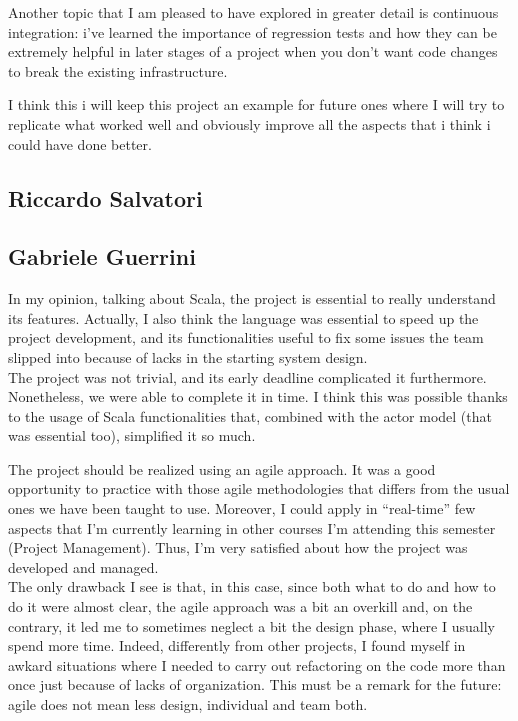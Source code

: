 Another topic that I am pleased to have explored in greater detail is continuous integration: i've learned the importance of regression tests and how they can be extremely helpful in later stages of a project when you don't want code changes to break the existing infrastructure.

I think this i will keep this project an example for future ones where I will try to replicate what worked well and
obviously improve all the aspects that i think i could have done better.




\subsection{Riccardo Salvatori}

\subsection{Gabriele Guerrini}
In my opinion, talking about Scala, the project is essential to really understand its features. Actually, I also think the language was essential to speed up the project development, and its functionalities useful to fix some issues the team slipped into because of lacks in the starting system design.
\\
The project was not trivial, and its early deadline complicated it furthermore. Nonetheless, we were able to complete it in time. I think this was possible thanks to the usage of Scala functionalities that, combined with the actor model (that was essential too), simplified it so much.

\bigskip
The project should be realized using an agile approach. It was a good opportunity to practice with those agile methodologies that differs from the usual ones we have been taught to use.
Moreover, I could apply in ``real-time'' few aspects that I'm currently learning in other courses I'm attending this semester (Project Management).
Thus, I'm very satisfied about how the project was developed and managed.
\\
The only drawback I see is that, in this case, since both what to do and how to do it were almost clear, the agile approach was a bit an overkill and, on the contrary, it led me to sometimes neglect a bit the design phase, where I usually spend more time. Indeed, differently from other projects, I found myself in awkard situations where I needed to carry out refactoring on the code more than once just because of lacks of organization. This must be a remark for the future: agile does not mean less design, individual and team both.

